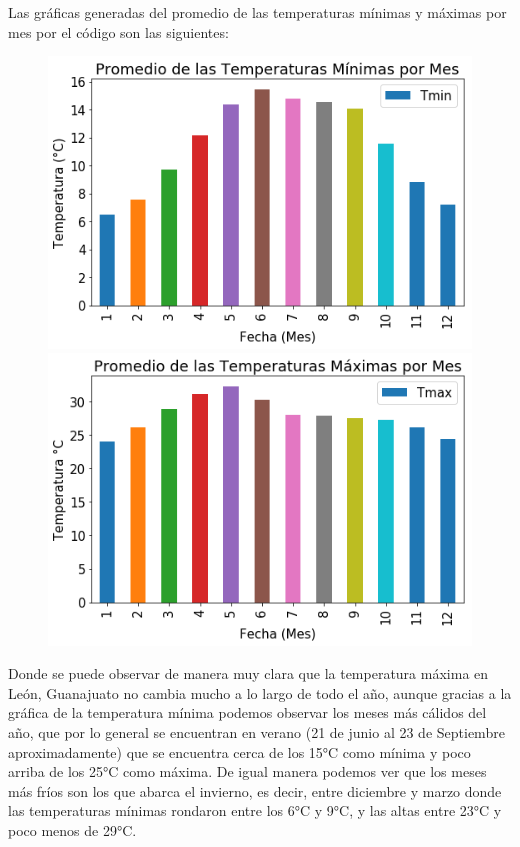 \documentclass{article}
\begin{document}
Las gráficas generadas del promedio de las temperaturas mínimas y máximas por mes por el código son las siguientes:
\begin{figure}[h]
\centering
  \begin{minipage}{0.4\textwidth}
    \centering
    \includegraphics[width=1\textwidth]{GTmin.png}
  \end{minipage}
  \hspace{5mm}
  \begin{minipage}{0.4\textwidth}
    \centering
    \includegraphics[width=1\textwidth]{GTmax.png}
  \end{minipage}
\end{figure}

Donde se puede observar de manera muy clara que la temperatura máxima en León, Guanajuato no cambia mucho a lo largo de todo el año, aunque gracias a la gráfica de la temperatura mínima podemos observar los meses más cálidos del año, que por lo general se encuentran en verano (21 de junio al 23 de Septiembre aproximadamente) que se encuentra cerca de los 15°C como mínima y poco arriba de los 25°C como máxima. De igual manera podemos ver que los meses más fríos son los que abarca el invierno, es decir, entre diciembre y marzo donde las temperaturas mínimas rondaron entre los 6°C y 9°C, y las altas entre 23°C y poco menos de 29°C.
\end{document}
